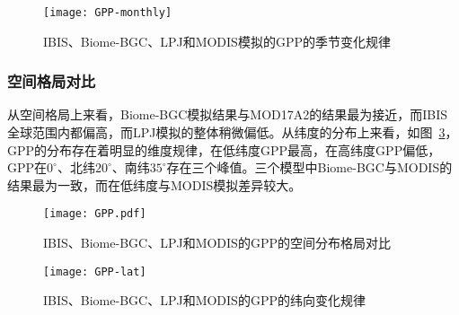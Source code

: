 \begin{figure}[!htbp]
    \centering
    \texttt{[image: GPP-monthly]}
    \caption{IBIS、Biome-BGC、LPJ和MODIS模拟的GPP的季节变化规律}
    \label{fig:GPP-monthly}
\end{figure}


\subsubsection{空间格局对比}
从空间格局上来看，Biome-BGC模拟结果与MOD17A2的结果最为接近，而IBIS全球范围内都偏高，而LPJ模拟的整体稍微偏低。从纬度的分布上来看，如图~\ref{fig:GPP-lat}，GPP的分布存在着明显的维度规律，在低纬度GPP最高，在高纬度GPP偏低，GPP在$0^{\circ}$、北纬$20^{\circ}$、南纬$35^{\circ}$存在三个峰值。三个模型中Biome-BGC与MODIS的结果最为一致，而在低纬度与MODIS模拟差异较大。

\begin{figure}[!htbp]
    \centering
    \texttt{[image: GPP.pdf]}
    \caption{IBIS、Biome-BGC、LPJ和MODIS的GPP的空间分布格局对比}
    \label{fig:GPP}
\end{figure}

\begin{figure}[!htbp]
    \centering
    \texttt{[image: GPP-lat]}
    \caption{IBIS、Biome-BGC、LPJ和MODIS的GPP的纬向变化规律}
    \label{fig:GPP-lat}
\end{figure}